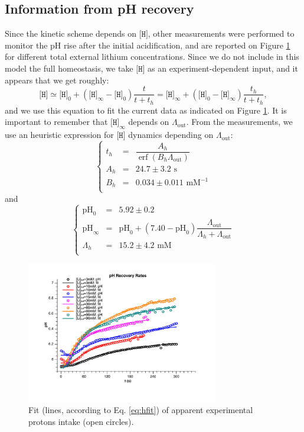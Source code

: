 \documentclass[aps,onecolumn,11pt]{revtex4}
\newcommand{\mychem}[1]{\mathtt{#1}}
\newcommand{\myconc}[1]{\big[#1\big]}
\newcommand{\spproton}{\mychem{H}}
\newcommand{\proton}{\myconc{\spproton}}
\newcommand{\myout}[1]{{#1}_{\mathrm{out}}}
\newcommand{\LiAll}{\Lambda}
\newcommand{\LiAllOut}{\myout{\LiAll}}
\DeclareMathOperator\erf{erf}
\newcommand{\pH}{\ensuremath{\mathrm{pH}}}
\begin{document}
\subsection{Information from pH recovery}
Since the kinetic scheme depends on $\proton$, other measurements were performed to monitor the pH rise after the initial acidification, 
and are reported on Figure \ref{fig:protons} for different total external lithium concentrations. Since we do not include in this model the full homeostasis,
we take $\proton$ as an experiment-dependent input, and it appears that we get roughly:
\begin{equation}
\label{eq:hfit}
	\proton \simeq \proton_0 + \left(\proton_\infty-\proton_0\right) \dfrac{t}{t+t_h} = \proton_\infty + \left(\proton_0 - \proton_\infty\right) \dfrac{t_h}{t+t_h},
\end{equation}
and we use this equation to fit the current data as indicated on Figure \ref{fig:protons}. It is important to remember that $\proton_\infty$ depends on $\LiAllOut$.
From the measurements, we use an heuristic expression for $\proton$ dynamics depending on $\LiAllOut$:
\begin{equation}
\left\lbrace
\begin{array}{rcl}
t_h & = & \dfrac{A_h}{\erf\left(B_h\LiAllOut\right)}\\
A_h & = & 24.7      \pm 3.2 \text{ s}\\
B_h & = & 0.034     \pm 0.011\text{ mM}^{-1}\\ 
\end{array}
\right.
\end{equation}
and
\begin{equation}
\left\lbrace
\begin{array}{rcl}
\pH_0      & = & 5.92 \pm 0.2 \\
\pH_\infty & = & \pH_0 + \left(7.40-\pH_0\right) \dfrac{\LiAllOut}{\LiAll_h+\LiAllOut}\\
\LiAll_h   & = & 15.2\pm4.2\text{ mM}\\
\end{array}
\right.
\end{equation}


\begin{figure}[!ht]
\begin{center}
\includegraphics[width=0.75\textwidth]{fig/protons.pdf}
\end{center}
\caption{\label{fig:protons} Fit (lines, according to Eq. \eqref{eq:hfit}) of apparent experimental protons intake (open circles).}
\end{figure}
\end{document}
